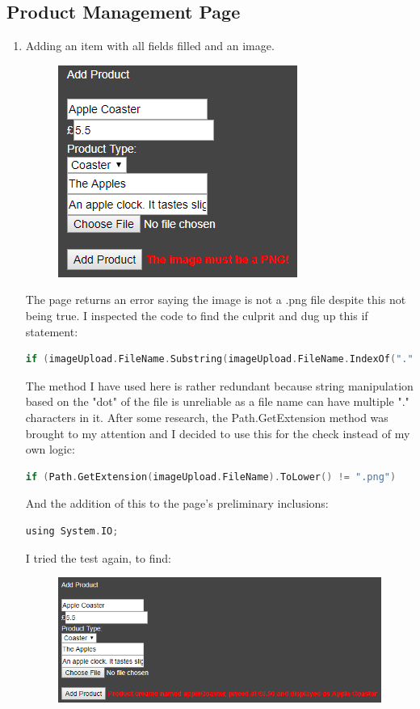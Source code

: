 ﻿\documentclass{article}
\begin{document}
    \subsection{Product Management Page}
    \begin{enumerate}
        \item Adding an item with all fields filled and an image.
        \begin{figure}[H]
            \includegraphics{testing/productManagement1.png}
            \centering
        \end{figure}
        The page returns an error saying the image is not a .png file despite this not being true.
        I inspected the code to find the culprit and dug up this if statement:
        \begin{lstlisting}[language=C]
if (imageUpload.FileName.Substring(imageUpload.FileName.IndexOf(".")) != "png")
        \end{lstlisting}
        The method I have used here is rather redundant because string manipulation based on the "dot" of the file is unreliable as a file name can have multiple "." characters in it.
        After some research, the Path.GetExtension method was brought to my attention and I decided to use this for the check instead of my own logic:
        \begin{lstlisting}[language=C]
if (Path.GetExtension(imageUpload.FileName).ToLower() != ".png")
        \end{lstlisting}
        And the addition of this to the page's preliminary inclusions:
        \begin{lstlisting}[language=C]
using System.IO;
        \end{lstlisting}
        I tried the test again, to find:
        \begin{figure}[H]
            \includegraphics{testing/productManagement2.png}

\end{figure}
\end{enumerate}
\end{document}
